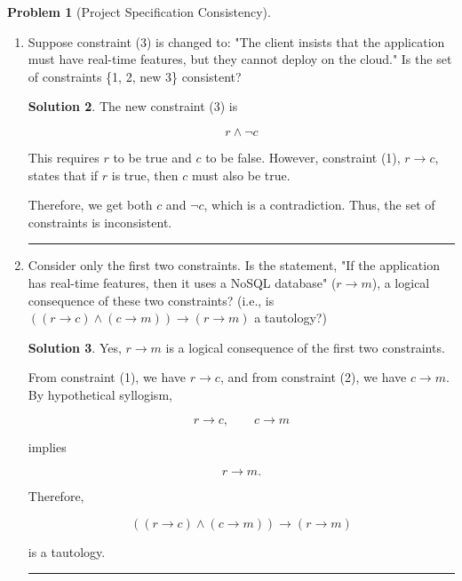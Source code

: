 \documentclass{article}
\theoremstyle{definition}
\newtheorem{problem}{Problem}
\def\fline{\rule{0.75\linewidth}{0.5pt}}
\newcommand{\finishline}{\begin{center}\fline\end{center}}
\newtheorem*{solution*}{Solution}
\newenvironment{solution}{\begin{solution*}}{{\finishline} \end{solution*}}
\begin{document}
\begin{problem}[Project Specification Consistency]
\begin{enumerate}[label=(\alph*)]
\begin{solution}
        This gives both $m$ and $\neg m$, which is a contradiction.
        Therefore, the three constraints are inconsistent, and the project
        cannot be built according to these specifications.

        \end{solution}
        \item Suppose constraint (3) is changed to: "The client insists that the application must have real-time features, but they cannot deploy on the cloud." Is the set of constraints \{1, 2, new 3\} consistent?

        \begin{solution}
        
        The new constraint (3) is

            \[
            r \land \neg c
            \]

            This requires $r$ to be true and $c$ to be false. However,
            constraint (1), $r \rightarrow c$, states that if $r$ is true,
            then $c$ must also be true.

            Therefore, we get both $c$ and $\neg c$, which is a contradiction.
            Thus, the set of constraints is inconsistent.
            
        \end{solution}
        \item Consider only the first two constraints. Is the statement, "If the application has real-time features, then it uses a NoSQL database" ($r \rightarrow m$), a logical consequence of these two constraints? (i.e., is $((r \rightarrow c) \land (c \rightarrow m)) \rightarrow (r \rightarrow m)$ a tautology?)

        \begin{solution}
         
            Yes, $r \rightarrow m$ is a logical consequence of the first two
            constraints.

            From constraint (1), we have $r \rightarrow c$, and from constraint
            (2), we have $c \rightarrow m$. By hypothetical syllogism,

            \[
            r \rightarrow c, \qquad c \rightarrow m
            \]

            implies

            \[
            r \rightarrow m.
            \]

            Therefore,

            \[
            ((r \rightarrow c) \land (c \rightarrow m))
            \rightarrow (r \rightarrow m)
            \]

            is a tautology.
            
        \end{solution}
    \end{enumerate}
\end{problem}
\end{document}
